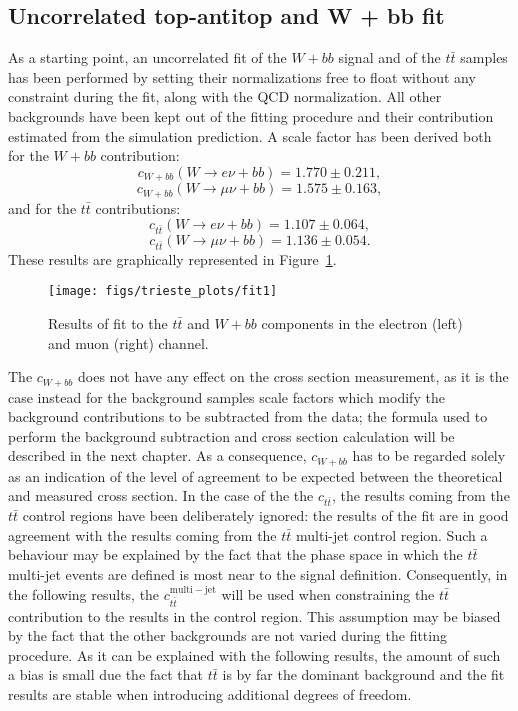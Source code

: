 \subsection{Uncorrelated top-antitop and W + bb fit}
As a starting point, an uncorrelated fit of the $W + bb$ signal and of the
$t\bar{t}$ samples has been performed by setting their normalizations
free to float without any constraint during the fit, along with the
QCD normalization.
All other backgrounds have been kept out of the fitting procedure
and their contribution estimated from the simulation prediction.
A scale factor has been derived both for the $W + bb$ contribution:
$$c_{W+bb}(W \rightarrow e \nu + bb) = 1.770 \pm 0.211 \mathrm{,}$$
$$c_{W+bb}(W \rightarrow \mu \nu + bb) = 1.575 \pm 0.163 \mathrm{,}$$
and for the $t\bar{t}$ contributions:
$$c_{t\bar{t}}(W \rightarrow e \nu + bb) = 1.107 \pm 0.064 \mathrm{,}$$
$$c_{t\bar{t}}(W \rightarrow \mu \nu + bb) = 1.136 \pm 0.054 \mathrm{.}$$
These results are graphically represented in Figure~\ref{fig:unconstrainedfit}.
\begin{figure}[htb]
        \begin{center}
                \leavevmode
                \texttt{[image: figs/trieste\_plots/fit1]}
        \end{center}
        \caption{Results of fit to the $t\bar{t}$ and $W+bb$ components in the electron (left) and
          muon (right) channel.}
        \label{fig:unconstrainedfit}
\end{figure}
The $c_{W+bb}$ does not have any effect on the cross section measurement,
as it is the case instead for the background samples scale factors which
modify the background contributions to be subtracted from the data;
the formula used to perform the background subtraction and cross section
calculation will be described in the next chapter.
As a consequence, $c_{W+bb}$ has to be regarded solely as an indication of the
level of agreement to be expected between the theoretical and measured
cross section.
In the case of the the $c_{t\bar{t}}$, the results coming from the
$t\bar{t}$ control regions have been deliberately ignored:
the results of the fit are in good agreement with the results coming from
the $t\bar{t}$ multi-jet control region. Such a behaviour may be
explained by the fact that the phase space in which the $t\bar{t}$ multi-jet
events are defined is most near to the signal definition.
Consequently, in the following results,
the $c_{t\bar{t}}^{\mathrm{multi-jet}}$ will be used when
constraining the $t\bar{t}$ contribution to the results in the control
region.
This assumption may be biased by the fact that the other backgrounds are
not varied during the fitting procedure. As it can be explained with the following results,
the amount of such a bias is small due the fact that $t\bar{t}$ is by
far the dominant background and the fit results are stable when
introducing additional degrees of freedom.



